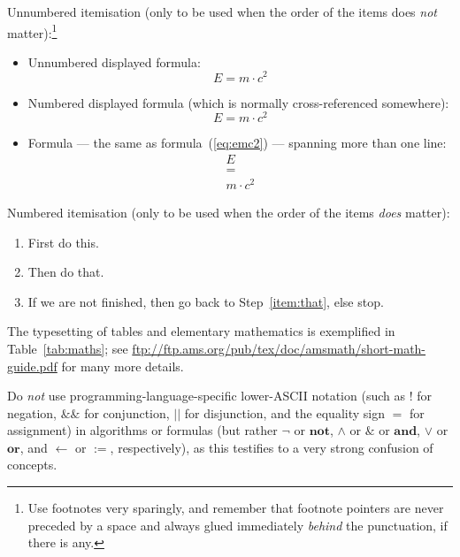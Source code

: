 \documentclass[a4paper,11pt]{article}
\begin{document}
Unnumbered itemisation (only to be used when the order of the items
does \emph{not} matter):\footnote{Use footnotes very sparingly, and
  remember that footnote pointers are never preceded by a space and
  always glued immediately \emph{behind} the punctuation, if there is
  any.}
\begin{itemize}
\item Unnumbered displayed formula:
  \[
  E = m \cdot c^2
  \]
\item Numbered displayed formula (which is normally cross-referenced
  somewhere):
  \begin{equation}
    \label{eq:emc2}
    E = m \cdot c^2
  \end{equation}
\item Formula --- the same as formula~(\ref{eq:emc2}) --- spanning
  more than one line:
  \begin{gather*}
    E \\ = \\ m \cdot c^2
  \end{gather*}  
\end{itemize}
Numbered itemisation (only to be used when the order of the items
\emph{does} matter):
\begin{enumerate}
\item First do this.
\item\label{item:that} Then do that.
\item If we are not finished, then go back to Step~\ref{item:that},
  else stop.
\end{enumerate}

The typesetting of tables and elementary mathematics is exemplified in
Table~\ref{tab:maths}; see
\url{ftp://ftp.ams.org/pub/tex/doc/amsmath/short-math-guide.pdf} for
many more details.

Do \emph{not} use programming-language-specific lower-ASCII notation
(such as $!$ for negation, $\&\&$ for conjunction, $||$ for
disjunction, and the equality sign $=$ for assignment) in algorithms
or formulas (but rather $\neg$ or $\mathbf{not}$, $\land$ or $\&$ or
$\mathbf{and}$, $\lor$ or $\mathbf{or}$, and $\gets$ or $:=$,
respectively), as this testifies to a very strong confusion of
concepts.
\end{document}
